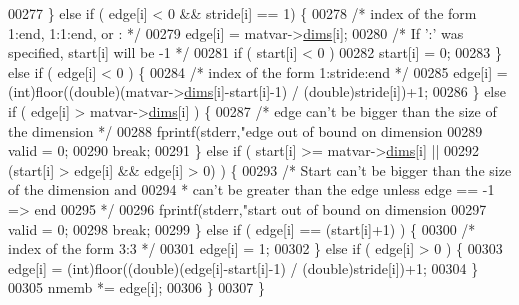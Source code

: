 \begin{DoxyCode}
{{{{00277             \} \textcolor{keywordflow}{else} \textcolor{keywordflow}{if} ( edge[i] < 0 && stride[i] == 1) \{
00278                 \textcolor{comment}{/* index of the form 1:end, 1:1:end, or : */}
00279                 edge[i] = matvar->\hyperlink{group___m_a_t_a8e01234e1c862ce3472bb37f5a09b92c}{dims}[i];
00280                 \textcolor{comment}{/* If ':' was specified, start[i] will be -1 */}
00281                 \textcolor{keywordflow}{if} ( start[i] < 0 )
00282                     start[i] = 0;
00283             \} \textcolor{keywordflow}{else} \textcolor{keywordflow}{if} ( edge[i] < 0 ) \{
00284                 \textcolor{comment}{/* index of the form 1:stride:end */}
00285                 edge[i] = (int)floor((\textcolor{keywordtype}{double})(matvar->\hyperlink{group___m_a_t_a8e01234e1c862ce3472bb37f5a09b92c}{dims}[i]-start[i]-1) / (\textcolor{keywordtype}{double})stride[i])+1;
00286             \} \textcolor{keywordflow}{else} \textcolor{keywordflow}{if} ( edge[i] > matvar->\hyperlink{group___m_a_t_a8e01234e1c862ce3472bb37f5a09b92c}{dims}[i] ) \{
00287                 \textcolor{comment}{/* edge can't be bigger than the size of the dimension */}
00288                 fprintf(stderr,\textcolor{stringliteral}{"edge out of bound on dimension %
00289                 valid = 0;
00290                 \textcolor{keywordflow}{break};
00291             \} \textcolor{keywordflow}{else} \textcolor{keywordflow}{if} ( start[i] >= matvar->\hyperlink{group___m_a_t_a8e01234e1c862ce3472bb37f5a09b92c}{dims}[i] ||
00292                         (start[i] > edge[i] && edge[i] > 0) ) \{
00293                 \textcolor{comment}{/* Start can't be bigger than the size of the dimension and}
00294 \textcolor{comment}{                 * can't be greater than the edge unless edge == -1 => end}
00295 \textcolor{comment}{                 */}
00296                 fprintf(stderr,\textcolor{stringliteral}{"start out of bound on dimension %
00297                 valid = 0;
00298                 \textcolor{keywordflow}{break};
00299             \} \textcolor{keywordflow}{else} \textcolor{keywordflow}{if} ( edge[i] == (start[i]+1) ) \{
00300                 \textcolor{comment}{/* index of the form 3:3 */}
00301                 edge[i] = 1;
00302             \} \textcolor{keywordflow}{else} \textcolor{keywordflow}{if} ( edge[i] > 0 ) \{
00303                 edge[i] = (int)floor((\textcolor{keywordtype}{double})(edge[i]-start[i]-1) / (\textcolor{keywordtype}{double})stride[i])+1;
00304             \}
00305             nmemb *= edge[i];
00306         \}
00307     \}
}}}}}}
\end{DoxyCode}
